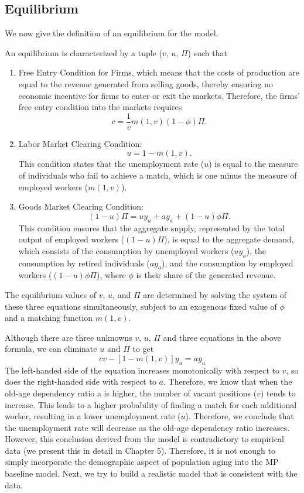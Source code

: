 \documentclass[ %
    final,
    scrbook,
    listoffigures,
    listoftables, 
    glossary]{cu-thesis}
\begin{document}
\subsection{Equilibrium}
We now give the definition of an equilibrium for the model.
\begin{definition}
An equilibrium is characterized by a tuple ($v$, $u$, $\Pi$) such that
\begin{enumerate}
\item Free Entry Condition for Firms, which means that the costs of production are equal to the revenue generated from selling goods, thereby ensuring no economic incentive for firms to enter or exit the markets. Therefore, the firms’ free entry condition into the markets requires 
\begin{equation}
    c=\frac{1}{v}m(1,v)(1-\phi)\Pi.
\end{equation}

\item Labor Market Clearing Condition:
\begin{equation}
u = 1-m(1, v).
\end{equation}
This condition states that the unemployment rate ($u$) is equal to the measure of individuals who fail to achieve a match, which is one minus the measure of employed workers ($m(1, v)$).
\item Goods Market Clearing Condition:
\begin{equation}
    (1-u)\Pi = uy_u + ay_a + (1-u)\phi\Pi.
\end{equation}
This condition ensures that the aggregate supply, represented by the total output of employed workers ($(1-u)\Pi$), is equal to the aggregate demand, which consists of the consumption by unemployed workers ($uy_u$), the consumption by retired individuals ($ay_a$), and the consumption by employed workers ($(1-u)\phi\Pi$), where $\phi$ is their share of the generated revenue.
\end{enumerate}
The equilibrium values of $v$, $u$, and $\Pi$ are determined by solving the system of these three equations simultaneously, subject to an exogenous fixed value of $\phi$ and a matching function $m(1, v)$.    
\end{definition}

Although there are three unknowns $v$, $u$, $\Pi$ and three
equations in the above formula, we can eliminate $u$ and $\Pi$ to get 
\begin{equation}
cv-[1-m(1, v)]y_u = ay_a
\end{equation}
The left-handed side of the equation increases monotonically with respect to $v$, so does the right-handed side with respect to $a$. Therefore, we know that when the old-age dependency ratio a is higher, the number of vacant positions ($v$) tends to increase. This leads to a higher probability of finding a match for each additional worker, resulting in a lower unemployment rate ($u$). Therefore, we conclude that the unemployment rate will decrease as the old-age dependency ratio increases. However, this conclusion derived from the model is contradictory to empirical data (we present this in detail in Chapter 5). Therefore, it is not enough to simply incorporate the demographic aspect of population aging into the MP baseline model. Next, we try to build a realistic model that is consistent with the data.
\end{document}

